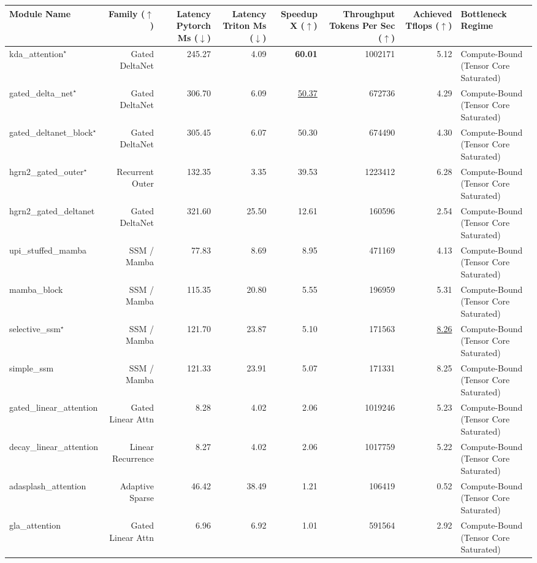 \begin{table}[t]
\centering
\small
\setlength{\tabcolsep}{5pt}
\begin{tabular}{lrrrrrrl}
\toprule
Module Name & Family ($\uparrow$) & Latency Pytorch Ms ($\downarrow$) & Latency Triton Ms ($\downarrow$) & Speedup X ($\uparrow$) & Throughput Tokens Per Sec ($\uparrow$) & Achieved Tflops ($\uparrow$) & Bottleneck Regime \\
\midrule
kda\_attention$^\star$ & Gated DeltaNet & 245.27 & 4.09 & \textbf{60.01} & 1002171 & 5.12 & Compute-Bound (Tensor Core Saturated) \\
gated\_delta\_net$^\star$ & Gated DeltaNet & 306.70 & 6.09 & \underline{50.37} & 672736 & 4.29 & Compute-Bound (Tensor Core Saturated) \\
gated\_deltanet\_block$^\star$ & Gated DeltaNet & 305.45 & 6.07 & 50.30 & 674490 & 4.30 & Compute-Bound (Tensor Core Saturated) \\
hgrn2\_gated\_outer$^\star$ & Recurrent Outer & 132.35 & 3.35 & 39.53 & 1223412 & 6.28 & Compute-Bound (Tensor Core Saturated) \\
hgrn2\_gated\_deltanet & Gated DeltaNet & 321.60 & 25.50 & 12.61 & 160596 & 2.54 & Compute-Bound (Tensor Core Saturated) \\
upi\_stuffed\_mamba & SSM / Mamba & 77.83 & 8.69 & 8.95 & 471169 & 4.13 & Compute-Bound (Tensor Core Saturated) \\
mamba\_block & SSM / Mamba & 115.35 & 20.80 & 5.55 & 196959 & 5.31 & Compute-Bound (Tensor Core Saturated) \\
selective\_ssm$^\star$ & SSM / Mamba & 121.70 & 23.87 & 5.10 & 171563 & \underline{8.26} & Compute-Bound (Tensor Core Saturated) \\
simple\_ssm & SSM / Mamba & 121.33 & 23.91 & 5.07 & 171331 & 8.25 & Compute-Bound (Tensor Core Saturated) \\
gated\_linear\_attention & Gated Linear Attn & 8.28 & 4.02 & 2.06 & 1019246 & 5.23 & Compute-Bound (Tensor Core Saturated) \\
decay\_linear\_attention & Linear Recurrence & 8.27 & 4.02 & 2.06 & 1017759 & 5.22 & Compute-Bound (Tensor Core Saturated) \\
adasplash\_attention & Adaptive Sparse & 46.42 & 38.49 & 1.21 & 106419 & 0.52 & Compute-Bound (Tensor Core Saturated) \\
gla\_attention & Gated Linear Attn & 6.96 & 6.92 & 1.01 & 591564 & 2.92 & Compute-Bound (Tensor Core Saturated) \\

\end{tabular}
\end{table}
